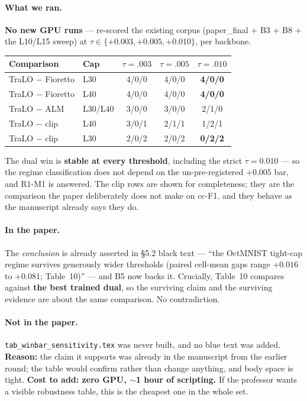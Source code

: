 \documentclass[11pt,a4paper]{article}
\begin{document}
\paragraph{What we ran.} \textbf{No new GPU runs} --- re-scored the existing corpus (paper\_final
$+$ B3 $+$ B8 $+$ the L10/L15 sweep) at $\tau \in \{+0.003, +0.005, +0.010\}$, per backbone.

\begin{center}
\begin{tabular}{@{}l l c c c@{}}
\toprule
\textbf{Comparison} & \textbf{Cap} & $\tau{=}.003$ & $\tau{=}.005$ & $\tau{=}.010$ \\
\midrule
TraLO $-$ Fioretto & L30 & 4/0/0 & 4/0/0 & \textbf{4/0/0} \\
TraLO $-$ Fioretto & L40 & 4/0/0 & 4/0/0 & \textbf{4/0/0} \\
TraLO $-$ ALM      & L30/L40 & 3/0/0 & 3/0/0 & 2/1/0 \\
TraLO $-$ clip     & L40 & 3/0/1 & 2/1/1 & 1/2/1 \\
TraLO $-$ clip     & L30 & 2/0/2 & 2/0/2 & \textbf{0/2/2} \\
\bottomrule
\end{tabular}
\end{center}

The dual win is \textbf{stable at every threshold}, including the strict $\tau{=}0.010$ --- so the
regime classification does not depend on the un-pre-registered $+0.005$ bar, and R1-M1 is answered.
The clip rows are shown for completeness; they are the comparison the paper deliberately does not
make on cc-F1, and they behave as the manuscript already says they do.

\paragraph{In the paper.} The \emph{conclusion} is already asserted in \S5.2 black text --- ``the
OctMNIST tight-cap regime survives generously wider thresholds (paired cell-mean gaps range
$+0.016$ to $+0.081$; Table~10)'' --- and B5 now backs it. Crucially, Table~10 compares against
\textbf{the best trained dual}, so the surviving claim and the surviving evidence are about the same
comparison. No contradiction.

\paragraph{Not in the paper.} \texttt{tab\_winbar\_sensitivity.tex} was never built, and no blue
text was added. \textbf{Reason:} the claim it supports was already in the manuscript from the
earlier round; the table would confirm rather than change anything, and body space is tight.
\textbf{Cost to add: zero GPU, $\sim$1 hour of scripting.} If the professor wants a visible
robustness table, this is the cheapest one in the whole set.
\end{document}
